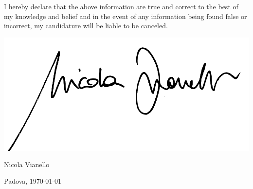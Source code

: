 \section{}
I hereby declare that the above information are true and correct to the best of my knowledge
and belief and in the event of any information being found false or incorrect, my candidature will be liable to be
canceled.

\vspace{0.5cm}

\includegraphics[height=4.5\baselineskip]{utils/signature} \par
Nicola Vianello \par
Padova, \today
